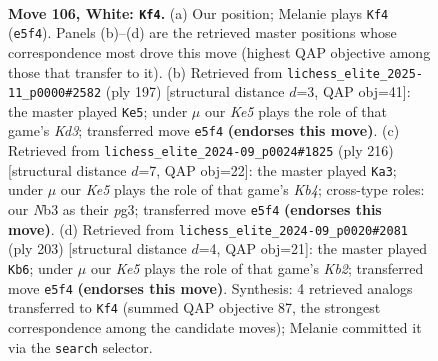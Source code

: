 \documentclass[11pt]{article}
\begin{document}
\clearpage

\begin{figure}[p]\centering
\begin{subfigure}{0.46\textwidth}\centering
\resizebox{\linewidth}{!}{%
\newchessgame
\chessboard[
  setfen={8/3k4/8/4K3/8/1N6/2R3Pr/8 w - - 76 106},
  showmover=false,
  pgfstyle=straightmove, color=movearrow, markmove={e5-f4}
]}
\caption{}
\end{subfigure}\hfill
\begin{subfigure}{0.46\textwidth}\centering
\resizebox{\linewidth}{!}{%
\newchessgame
\chessboard[
  setfen={8/8/3k4/1K6/7r/7p/7R/8 b - - 14 99},
  showmover=false,
  pgfstyle=straightmove, color=movearrow, markmove={d6-e5}
]}
\caption{}
\end{subfigure}
\\[4pt]
\begin{subfigure}{0.46\textwidth}\centering
\resizebox{\linewidth}{!}{%
\newchessgame
\chessboard[
  setfen={8/8/5k2/7R/1K5P/6p1/7r/8 w - - 0 109},
  showmover=false,
  pgfstyle=straightmove, color=movearrow, markmove={b4-a3}
]}
\caption{}
\end{subfigure}\hfill
\begin{subfigure}{0.46\textwidth}\centering
\resizebox{\linewidth}{!}{%
\newchessgame
\chessboard[
  setfen={8/1k6/8/8/8/R7/p6r/2K5 b - - 31 102},
  showmover=false,
  pgfstyle=straightmove, color=movearrow, markmove={b7-b6}
]}
\caption{}
\end{subfigure}
\caption{\textbf{Move 106, White: \texttt{Kf4}.} (a) Our position; Melanie plays \texttt{Kf4} (\texttt{e5f4}). Panels (b)--(d) are the retrieved master positions whose correspondence most drove this move (highest QAP objective among those that transfer to it). (b) Retrieved from \texttt{lichess\_elite\_2025-11\_p0000\#2582} (ply 197) [structural distance $d$=3, QAP obj=41]: the master played \texttt{Ke5}; under $\mu$ our \emph{Ke5} plays the role of that game's \emph{Kd3}; transferred move \texttt{e5f4} \textbf{(endorses this move)}. (c) Retrieved from \texttt{lichess\_elite\_2024-09\_p0024\#1825} (ply 216) [structural distance $d$=7, QAP obj=22]: the master played \texttt{Ka3}; under $\mu$ our \emph{Ke5} plays the role of that game's \emph{Kb4}; cross-type roles: our \emph{N}b3 as their \emph{p}g3; transferred move \texttt{e5f4} \textbf{(endorses this move)}. (d) Retrieved from \texttt{lichess\_elite\_2024-09\_p0020\#2081} (ply 203) [structural distance $d$=4, QAP obj=21]: the master played \texttt{Kb6}; under $\mu$ our \emph{Ke5} plays the role of that game's \emph{Kb2}; transferred move \texttt{e5f4} \textbf{(endorses this move)}. Synthesis: 4 retrieved analogs transferred to \texttt{Kf4} (summed QAP objective 87, the strongest correspondence among the candidate moves); Melanie committed it via the \texttt{search} selector.}
\label{fig:thought-m210}
\end{figure}
\end{document}
